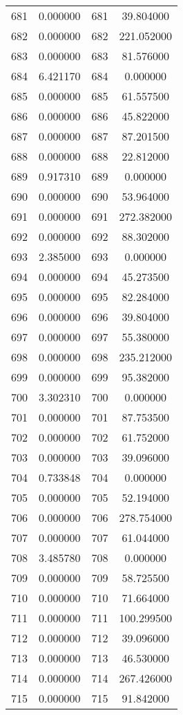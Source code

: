\documentclass[12pt]{article}
\begin{document}
\begin{longtable}{@{}cccc@{}}
681 & 0.000000 & 681 & 39.804000 \\
682 & 0.000000 & 682 & 221.052000 \\
683 & 0.000000 & 683 & 81.576000 \\
684 & 6.421170 & 684 & 0.000000 \\
685 & 0.000000 & 685 & 61.557500 \\
686 & 0.000000 & 686 & 45.822000 \\
687 & 0.000000 & 687 & 87.201500 \\
688 & 0.000000 & 688 & 22.812000 \\
689 & 0.917310 & 689 & 0.000000 \\
690 & 0.000000 & 690 & 53.964000 \\
691 & 0.000000 & 691 & 272.382000 \\
692 & 0.000000 & 692 & 88.302000 \\
693 & 2.385000 & 693 & 0.000000 \\
694 & 0.000000 & 694 & 45.273500 \\
695 & 0.000000 & 695 & 82.284000 \\
696 & 0.000000 & 696 & 39.804000 \\
697 & 0.000000 & 697 & 55.380000 \\
698 & 0.000000 & 698 & 235.212000 \\
699 & 0.000000 & 699 & 95.382000 \\
700 & 3.302310 & 700 & 0.000000 \\
701 & 0.000000 & 701 & 87.753500 \\
702 & 0.000000 & 702 & 61.752000 \\
703 & 0.000000 & 703 & 39.096000 \\
704 & 0.733848 & 704 & 0.000000 \\
705 & 0.000000 & 705 & 52.194000 \\
706 & 0.000000 & 706 & 278.754000 \\
707 & 0.000000 & 707 & 61.044000 \\
708 & 3.485780 & 708 & 0.000000 \\
709 & 0.000000 & 709 & 58.725500 \\
710 & 0.000000 & 710 & 71.664000 \\
711 & 0.000000 & 711 & 100.299500 \\
712 & 0.000000 & 712 & 39.096000 \\
713 & 0.000000 & 713 & 46.530000 \\
714 & 0.000000 & 714 & 267.426000 \\
715 & 0.000000 & 715 & 91.842000 \\

\end{longtable}
\end{document}
